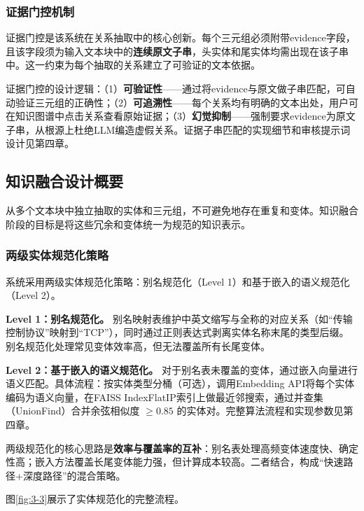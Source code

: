\subsubsection{证据门控机制}

证据门控是该系统在关系抽取中的核心创新。每个三元组必须附带evidence字段，且该字段须为输入文本块中的\textbf{连续原文子串}，头实体和尾实体均需出现在该子串中。这一约束为每个抽取的关系建立了可验证的文本依据。

证据门控的设计逻辑：（1）\textbf{可验证性}——通过将evidence与原文做子串匹配，可自动验证三元组的正确性；（2）\textbf{可追溯性}——每个关系均有明确的文本出处，用户可在知识图谱中点击关系查看原始证据；（3）\textbf{幻觉抑制}——强制要求evidence为原文子串，从根源上杜绝LLM编造虚假关系。证据子串匹配的实现细节和审核提示词设计见第四章。

\subsection{知识融合设计概要}

从多个文本块中独立抽取的实体和三元组，不可避免地存在重复和变体。知识融合阶段的目标是将这些冗余和变体统一为规范的知识表示。

\subsubsection{两级实体规范化策略}

系统采用两级实体规范化策略：别名规范化（Level 1）和基于嵌入的语义规范化（Level 2）。

\textbf{Level 1：别名规范化。} 别名映射表维护中英文缩写与全称的对应关系（如“传输控制协议”映射到“TCP”），同时通过正则表达式剥离实体名称末尾的类型后缀。别名规范化处理常见变体效率高，但无法覆盖所有长尾变体。

\textbf{Level 2：基于嵌入的语义规范化。} 对于别名表未覆盖的变体，通过嵌入向量进行语义匹配。具体流程：按实体类型分桶（可选），调用Embedding API将每个实体编码为语义向量，在FAISS IndexFlatIP索引上做最近邻搜索，通过并查集（UnionFind）合并余弦相似度 $\geq 0.85$ 的实体对。完整算法流程和实现参数见第四章。

两级规范化的核心思路是\textbf{效率与覆盖率的互补}：别名表处理高频变体速度快、确定性高；嵌入方法覆盖长尾变体能力强，但计算成本较高。二者结合，构成“快速路径+深度路径”的混合策略。

图\ref{fig:3-3}展示了实体规范化的完整流程。

